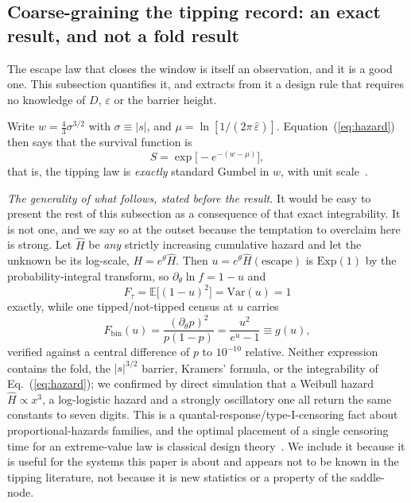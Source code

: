 \documentclass[%
 aip,
 cha,
 amsmath,amssymb,
 reprint,
 superscriptaddress,
 floatfix,
]{revtex4-2}
\newcommand{\Sig}{\hat\varepsilon}
\begin{document}
\subsection{\label{sec:census}Coarse-graining the tipping record: an exact result, and not a fold result}

The escape law that closes the window is itself an observation, and it is a good one.  This subsection quantifies it, and extracts from it a design rule that requires no knowledge of $D$, $\varepsilon$ or the barrier height.

Write $w=\tfrac43\sigma^{3/2}$ with $\sigma\equiv|s|$, and $\mu=\ln[1/(2\pi\,\Sig)]$.  Equation~(\ref{eq:hazard}) then says that the survival function is
\begin{equation}
\label{eq:gumbel}
S=\exp\bigl[-e^{-(w-\mu)}\bigr],
\end{equation}
that is, the tipping law is \emph{exactly} standard Gumbel in $w$, with unit scale~\cite{Gumbel1958}.

\emph{The generality of what follows, stated before the result.}  It would be easy to present the rest of this subsection as a consequence of that exact integrability.  It is not one, and we say so at the outset because the temptation to overclaim here is strong.  Let $\hat H$ be \emph{any} strictly increasing cumulative hazard and let the unknown be its log-scale, $H=e^{\theta}\hat H$.  Then $u=e^{\theta}\hat H(\text{escape})$ is $\mathrm{Exp}(1)$ by the probability-integral transform, so $\partial_\theta\ln f=1-u$ and
\begin{equation}
\label{eq:ftau}
F_\tau=\mathbb{E}\bigl[(1-u)^2\bigr]=\mathrm{Var}(u)=1
\end{equation}
exactly, while one tipped/not-tipped census at $u$ carries
\begin{equation}
\label{eq:fbin}
F_{\mathrm{bin}}(u)=\frac{(\partial_\theta p)^2}{p(1-p)}=\frac{u^2}{e^{u}-1}\equiv g(u),
\end{equation}
verified against a central difference of $p$ to $10^{-10}$ relative.  Neither expression contains the fold, the $|s|^{3/2}$ barrier, Kramers' formula, or the integrability of Eq.~(\ref{eq:hazard}); we confirmed by direct simulation that a Weibull hazard $\hat H\propto x^3$, a log-logistic hazard and a strongly oscillatory one all return the same constants to seven digits.  This is a quantal-response/type-I-censoring fact about proportional-hazards families, and the optimal placement of a single censoring time for an extreme-value law is classical design theory~\cite{Gertsbakh1995,LehmannCasella1998}.  We include it because it is useful for the systems this paper is about and appears not to be known in the tipping literature, not because it is new statistics or a property of the saddle-node.
\end{document}
